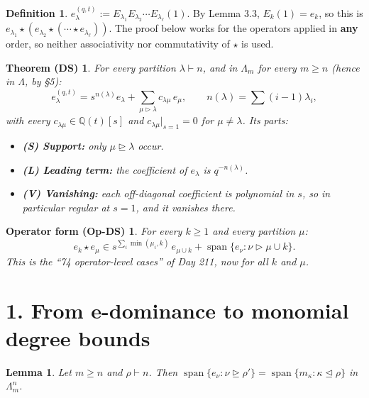 \documentclass[11pt]{article}
\newtheorem*{theoremDS}{Theorem (DS)}
\newtheorem*{opDS}{Operator form (Op-DS)}
\newtheorem{genericlemma}{Lemma}
\newenvironment{lem}[1]{\renewcommand{\thegenericlemma}{#1}\begin{genericlemma}}{\end{genericlemma}}
\theoremstyle{definition}
\newtheorem*{definition}{Definition}
\newcommand{\Q}{\mathbb{Q}}
\newcommand{\dom}{\trianglerighteq}
\newcommand{\sdom}{\triangleright}
\newcommand{\domd}{\trianglelefteq}
\begin{document}
\begin{definition}
$e_\lambda^{(q,t)} := E_{\lambda_1}E_{\lambda_2}\cdots E_{\lambda_\ell}(1)$. By Lemma 3.3, $E_k(1) = e_k$, so this is $e_{\lambda_1}\star(e_{\lambda_2}\star(\cdots\star e_{\lambda_\ell}))$. The proof below works for the operators applied in \textbf{any} order, so neither associativity nor commutativity of $\star$ is used.
\end{definition}

\begin{theoremDS}
For every partition $\lambda \vdash n$, and in $\Lambda_m$ for every $m \ge n$ (hence in $\Lambda$, by \S5):
\[
e_\lambda^{(q,t)} = s^{n(\lambda)} e_\lambda + \sum_{\mu \sdom \lambda} c_{\lambda\mu}\, e_\mu, \qquad n(\lambda) = \sum (i-1)\lambda_i,
\]
with every $c_{\lambda\mu} \in \Q(t)[s]$ and $c_{\lambda\mu}|_{s=1} = 0$ for $\mu \ne \lambda$. Its parts:
\begin{itemize}
\item \textbf{(S) Support:} only $\mu \dom \lambda$ occur.
\item \textbf{(L) Leading term:} the coefficient of $e_\lambda$ is $q^{-n(\lambda)}$.
\item \textbf{(V) Vanishing:} each off-diagonal coefficient is \emph{polynomial} in $s$, so in particular regular at $s = 1$, and it vanishes there.
\end{itemize}
\end{theoremDS}

\begin{opDS}
For every $k \ge 1$ and every partition $\mu$:
\[
e_k\star e_\mu \in s^{\sum_i \min(\mu_i,k)}\, e_{\mu\cup k} + \operatorname{span}\{e_\nu : \nu \sdom \mu\cup k\}.
\]
This is the ``74 operator-level cases'' of Day 211, now for all $k$ and $\mu$.
\end{opDS}

\section*{1. From e-dominance to monomial degree bounds}

\begin{lem}{1.1}
Let $m \ge n$ and $\rho \vdash n$. Then $\operatorname{span}\{e_\nu : \nu \dom \rho'\} = \operatorname{span}\{m_\kappa : \kappa \domd \rho\}$ in $\Lambda_m^n$.
\end{lem}
\end{document}

